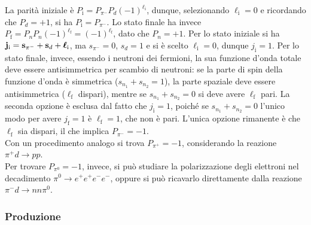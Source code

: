 La parità iniziale è $ P_{\text{i}} = P_{\pi^-} P_d \left( -1 \right)^{\ell_{\text{i}}} $, dunque, selezionando $ \ell_{\text{i}} = 0 $ e ricordando che $ P_d = +1 $, si ha $ P_{\text{i}} = P_{\pi^-} $. Lo stato finale ha invece $ P_{\text{f}} = P_n P_n \left( -1 \right)^{\ell_{\text{f}}} = \left( -1 \right)^{\ell_{\text{f}}} $, dato che $ P_n = +1 $. Per lo stato iniziale si ha $ \mathbf{j}_{\text{i}} = \mathbf{s}_{\pi^-} + \mathbf{s}_d + \boldsymbol{\ell}_{\text{i}} $, ma $ s_{\pi^-} = 0 $, $ s_d = 1 $ e si è scelto $ \ell_{\text{i}} = 0 $, dunque $ j_{\text{i}} = 1 $. Per lo stato finale, invece, essendo i neutroni dei fermioni, la sua funzione d'onda totale deve essere antisimmetrica per scambio di neutroni: se la parte di spin della funzione d'onda è simmetrica ($ s_{n_1} + s_{n_2} = 1 $), la parte spaziale deve essere antisimmetrica ($ \ell_{\text{f}} $ dispari), mentre se $ s_{n_1} + s_{n_2} = 0 $ si deve avere $ \ell_{\text{f}} $ pari. La seconda opzione è esclusa dal fatto che $ j_{\text{i}} = 1 $, poiché se $ s_{n_1} + s_{n_2} = 0 $ l'unico modo per avere $ j_{\text{f}} = 1 $ è $ \ell_{\text{f}} = 1 $, che non è pari. L'unica opzione rimanente è che $ \ell_{\text{f}} $ sia dispari, il che implica $ P_{\pi^-} = -1 $.\\
Con un procedimento analogo si trova $ P_{\pi^+} = -1 $, considerando la reazione $ \pi^+ d \rightarrow p p $.\\
Per trovare $ P_{\pi^0} = -1 $, invece, si può studiare la polarizzazione degli elettroni nel decadimento $ \pi^0 \rightarrow e^+ e^+ e^- e^- $, oppure si può ricavarlo direttamente dalla reazione $ \pi^- d \rightarrow n n \pi^0 $.

\subsubsection{Produzione}

